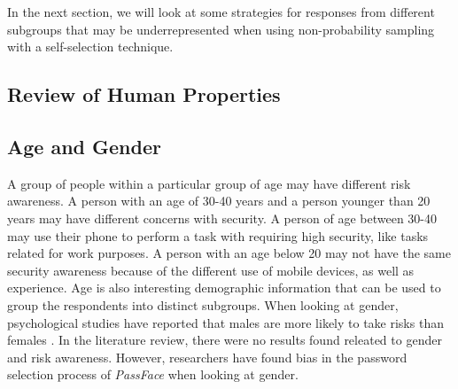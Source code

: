     In the next section, we will look at some strategies for responses from different subgroups that may be underrepresented when using non-probability sampling with a self-selection technique. 

  \clearpage
  \subsection{Review of Human Properties}\label{sec:reviewofproperties}

      
      \subsection*{Age and Gender} 
      A group of people within a particular group of age may have different risk awareness. A person with an age of 30-40 years and a person younger than 20 years may have different concerns with security. A person of age between 30-40 may use their phone to perform a task with requiring high security, like tasks related for work purposes. A person with an age below 20 may not have the same security awareness because of the different use of mobile devices, as well as experience. Age is also interesting demographic information that can be used to group the respondents into distinct subgroups. When looking at gender, psychological studies have reported that males are more likely to take risks than females \cite{Byrnes}. In the literature review, there were no results found releated to gender and risk awareness. However, researchers have found bias in the password selection process of {\it PassFace} when looking at gender.

